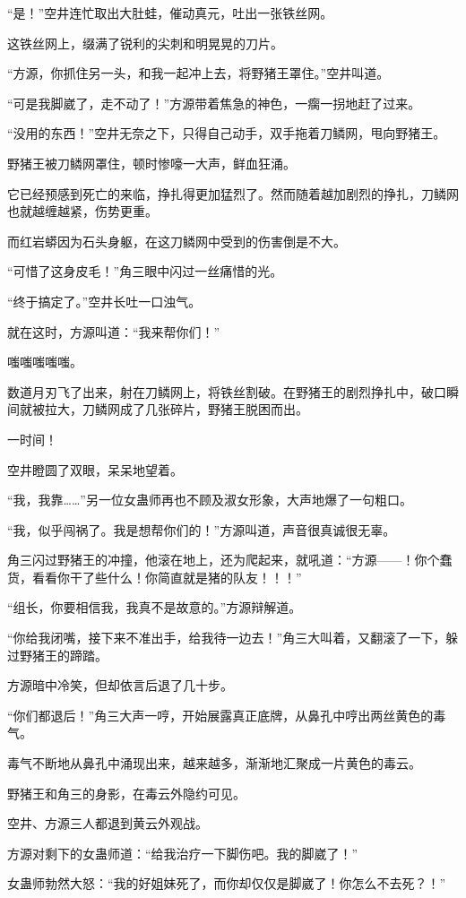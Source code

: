 \begin{this_body}
“是！”空井连忙取出大肚蛙，催动真元，吐出一张铁丝网。

这铁丝网上，缀满了锐利的尖刺和明晃晃的刀片。

“方源，你抓住另一头，和我一起冲上去，将野猪王罩住。”空井叫道。

“可是我脚崴了，走不动了！”方源带着焦急的神色，一瘸一拐地赶了过来。

“没用的东西！”空井无奈之下，只得自己动手，双手拖着刀鳞网，甩向野猪王。

野猪王被刀鳞网罩住，顿时惨嚎一大声，鲜血狂涌。

它已经预感到死亡的来临，挣扎得更加猛烈了。然而随着越加剧烈的挣扎，刀鳞网也就越缠越紧，伤势更重。

而红岩蟒因为石头身躯，在这刀鳞网中受到的伤害倒是不大。

“可惜了这身皮毛！”角三眼中闪过一丝痛惜的光。

“终于搞定了。”空井长吐一口浊气。

就在这时，方源叫道：“我来帮你们！”

嗤嗤嗤嗤嗤。

数道月刃飞了出来，射在刀鳞网上，将铁丝割破。在野猪王的剧烈挣扎中，破口瞬间就被拉大，刀鳞网成了几张碎片，野猪王脱困而出。

一时间！

空井瞪圆了双眼，呆呆地望着。

“我，我靠……”另一位女蛊师再也不顾及淑女形象，大声地爆了一句粗口。

“我，似乎闯祸了。我是想帮你们的！”方源叫道，声音很真诚很无辜。

角三闪过野猪王的冲撞，他滚在地上，还为爬起来，就吼道：“方源——！你个蠢货，看看你干了些什么！你简直就是猪的队友！！！”

“组长，你要相信我，我真不是故意的。”方源辩解道。

“你给我闭嘴，接下来不准出手，给我待一边去！”角三大叫着，又翻滚了一下，躲过野猪王的蹄踏。

方源暗中冷笑，但却依言后退了几十步。

“你们都退后！”角三大声一哼，开始展露真正底牌，从鼻孔中哼出两丝黄色的毒气。

毒气不断地从鼻孔中涌现出来，越来越多，渐渐地汇聚成一片黄色的毒云。

野猪王和角三的身影，在毒云外隐约可见。

空井、方源三人都退到黄云外观战。

方源对剩下的女蛊师道：“给我治疗一下脚伤吧。我的脚崴了！”

女蛊师勃然大怒：“我的好姐妹死了，而你却仅仅是脚崴了！你怎么不去死？！”


\end{this_body}
